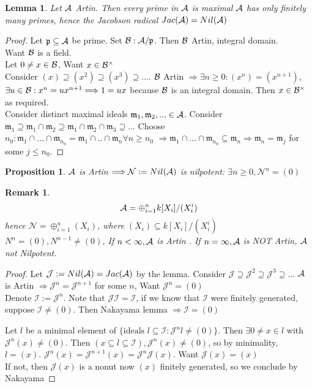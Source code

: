\documentclass[11pt]{article}
\newtheorem{prop}[thm]{Proposition}
\newtheorem{lemma}[thm]{Lemma}
\newtheorem{rmk}[thm]{Remark}
\newcommand{\scm}{{\mathfrak m}}
\newcommand{\scp}{{\mathfrak p}}
\newcommand{\cala}{{\cal A}}
\newcommand{\calb}{{\cal B}}
\newcommand{\Lrta}{\Longrightarrow}
\begin{document}
\begin{lemma}\label{lem:primes_are_maximal_in_Artin}
Let $\cala$ Artin. Then every prime in $\cala$ is maximal $\cala$ has only finitely many primes, hence the Jacobson radical $Jac(\cala)=Nil(\cala)$
\end{lemma}
\begin{proof}
Let $\scp\subseteq \cala$ be prime. Set $\calb:\cala/\scp$. Then $\calb$ Artin, integral domain.
\\
Want $\calb$ is a field.\\
Let $0\neq x\in \calb$, Want $x\in \calb^\times$\\
Consider $(x)\supseteq (x^2)\supseteq (x^3)\supseteq...$. $\calb$ Artin $\Lrta \exists n\geq 0: (x^n)=(x^{n+1})$, $\exists u\in \calb:x^n=u x^{n+1}\Lrta 1=ux$ because $\calb$ is an integral domain. Then $x\in\calb^{\times}$ as required.\\
Consider distinct maximal ideals $\scm_1,\scm_2,...\in\cala$. Consider $\scm_1\supseteq \scm_1\cap \scm_2\supseteq \scm_1\cap\scm_2\cap \scm_3\supseteq ...$ Choose $n_0: \scm_1\cap...\cap \scm_{n_0}=\scm_1\cap..\cap\scm_n \forall n\geq n_0$ $\Lrta \scm_1\cap...\cap\scm_{n_0}\subseteq \scm_n\Lrta \scm_n=\scm_j$ for some $j\leq n_0$.
\end{proof}

\begin{prop}\label{prop:Artin_nilpotent_nilradical}
$\cala$ is Artin $\Lrta \mathcal{N}:=Nil(\cala)$ is nilpotent: $\exists n\geq 0,\mathcal{N}^n=(0)$
\end{prop}
\begin{rmk}
$$
\cala=\oplus^n_{i=1}k[X_i]/(X^i_i)
$$
hence $\mathcal{N}=\oplus^n_{i=1}(X_i)$, where $(X_i)\subseteq k[X_i]/(X^i_i)$ $N^n=(0), N^{n-1}\neq (0)$, If $n<\infty, \cala$ is Artin . If $n=\infty, \cala$ is NOT Artin, $\cala$ not Nilpotent.
\end{rmk}

\begin{proof}
Let $\mathcal{J}:= Nil(\cala)=Jac(\cala)$ by the lemma. Consider $\mathcal{J}\supseteq \mathcal{J}^2\supseteq \mathcal{J}^3\supseteq ...$ $\cala$ is Artin $\Lrta \mathcal{J}^n=\mathcal{J}^{n+1}$ for some $n$, Want $\mathcal{J}^n=(0)$\\

Denote $\mathcal{I}:=\mathcal{J}^n$. Note that $\mathcal{J}\mathcal{I}=\mathcal{I}$, if we know that $\mathcal{I}$ were finitely generated, suppose $\mathcal{I}\neq (0)$. Then Nakayama lemma $\Lrta \mathcal{I}=(0)$

Let $l$ be a minimal element of $\{\text{ideals $l\subseteq \mathcal{I}:\mathcal{J}^nl\neq (0)$}\}$. Then $\exists 0\neq x\in l$ with $\mathcal{J}^n(x)\neq (0)$. Then $(x\subseteq l\subseteq \mathcal{I}), \mathcal{J}^n (x)\neq (0)$, so by minimality, $l=(x)$.
$\mathcal{J}^n(x)=\mathcal{J}^{n+1}(x)=\mathcal{J}^n\mathcal{J}(x)$.
Want $\mathcal{J}(x)=(x)$\\
If not, then $\mathcal{J}(x)$ is a nonut now $(x)$ finitely generated, so we conclude by Nakayama
\end{proof}
\end{document}
